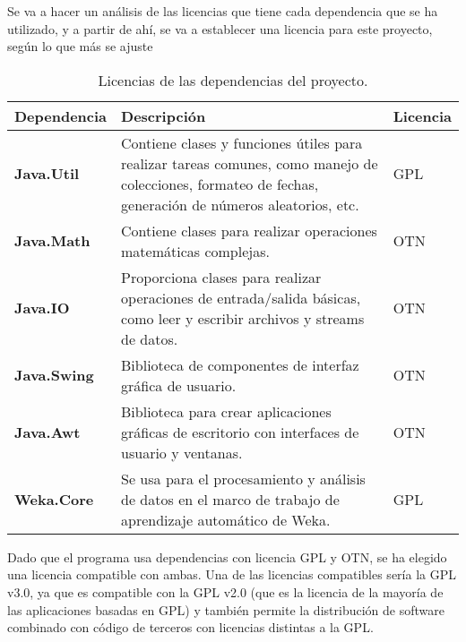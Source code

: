 Se va a hacer un análisis de las licencias que tiene cada dependencia que se ha utilizado, y a partir de ahí, se va a establecer una licencia para este proyecto, según lo que más se ajuste
\begin{table}[b]
    \centering
	\begin{tabularx}{\linewidth}{ p{} p{} p{}}
		\toprule
		\textbf{Dependencia} & \textbf{Descripción} & \textbf{Licencia}\\
		\toprule
		\textbf{Java.Util} & Contiene clases y funciones útiles para realizar tareas comunes, como manejo de colecciones, formateo de fechas, generación de números aleatorios, etc. & GPL \\
		\textbf{Java.Math} & Contiene clases para realizar operaciones matemáticas complejas. & OTN \\
  	\textbf{Java.IO} & Proporciona clases para realizar operaciones de entrada/salida básicas, como leer y escribir archivos y streams de datos. & OTN \\
   	\textbf{Java.Swing} & Biblioteca de componentes de interfaz gráfica de usuario. & OTN \\
       \textbf{Java.Awt} & Biblioteca para crear aplicaciones gráficas de escritorio con interfaces de usuario y ventanas. & OTN \\
       \textbf{Weka.Core} & Se usa para el procesamiento y análisis de datos en el marco de trabajo de aprendizaje automático de Weka. & GPL \\
		\bottomrule
	\end{tabularx}
	\caption{Licencias de las dependencias del proyecto.}
\end{table}

Dado que el programa usa dependencias con licencia GPL y OTN, se ha elegido una licencia compatible con ambas. Una de las licencias compatibles sería la GPL v3.0, ya que es compatible con la GPL v2.0 (que es la licencia de la mayoría de las aplicaciones basadas en GPL) y también permite la distribución de software combinado con código de terceros con licencias distintas a la GPL. \cite{wiki:licence}

